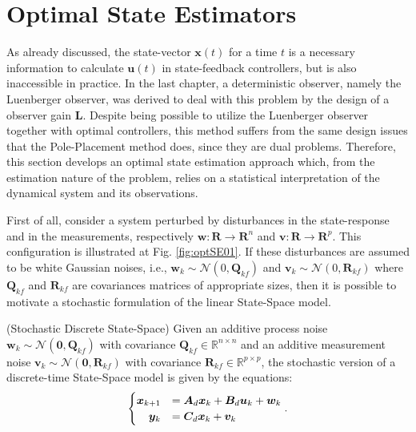 \documentclass[a4paper,11pt]{book}
\numberwithin{figure}{chapter}
\numberwithin{equation}{chapter}
\numberwithin{table}{chapter}
\theoremstyle{definition}
\newtheorem{definition}{Definition}[chapter]
\newcounter{boxed-theorem}
\newcounter{boxed-definition}
\newenvironment{boxed-definition}[1]
{\begin{shaded} \begin{definition}{#1}}
{\end{definition} \end{shaded}}
\begin{document}
\section{Optimal State Estimators}

As already discussed, the state-vector $\bm{x}(t)$ for a time $t$ is a necessary information to calculate $\bm{u}(t)$ in state-feedback controllers, but is also inaccessible in practice. In the last chapter, a deterministic observer, namely the Luenberger observer, was derived to deal with this problem by the design of a observer gain $\bm{L}$. Despite being possible to utilize the Luenberger observer together with optimal controllers, this method suffers from the same design issues that the Pole-Placement method does, since they are dual problems. Therefore, this section develops an optimal state estimation approach which, from the estimation nature of the problem, relies on a statistical interpretation of the dynamical system and its observations.

First of all, consider a system perturbed by disturbances in the state-response and in the measurements, respectively $\bm{w} : \bm{R} \rightarrow \bm{R}^{n}$ and $\bm{v} : \bm{R} \rightarrow \bm{R}^{p}$. This configuration is illustrated at Fig. \ref{fig:optSE01}. If these disturbances are assumed to be white Gaussian noises, i.e., $\bm{w}_k \sim \mathcal{N}(0, \bm{Q}_{kf})$ and $\bm{v}_k \sim \mathcal{N}(0, \bm{R}_{kf})$ where $\bm{Q}_{kf}$ and $\bm{R}_{kf}$ are covariances matrices of appropriate sizes, then it is possible to motivate a stochastic formulation of the linear State-Space model.

\begin{boxed-definition}{(Stochastic Discrete State-Space)} \label{def:stochSS}
    Given an additive process noise $\bm{w}_k \sim \mathcal{N}(\bm{0}, \bm{Q}_{kf})$ with covariance $\bm{Q}_{kf} \in \mathbb{R}^{n \times n}$ and an additive measurement noise $\bm{v}_k \sim \mathcal{N}(\bm{0}, \bm{R}_{kf})$ with covariance $\bm{R}_{kf} \in \mathbb{R}^{p \times p}$, the stochastic version of a discrete-time State-Space model is given by the equations:
    \begin{align}
    \begin{cases}
        \hfill \bm{x}_{k+1} &= \bm{A}_d \bm{x}_k + \bm{B}_d \bm{u}_k + \bm{w}_k \\
        \hfill \bm{y}_k &= \bm{C}_d \bm{x}_k + \bm{v}_k 
    \end{cases}
    .\end{align}
\end{boxed-definition}
\end{document}
